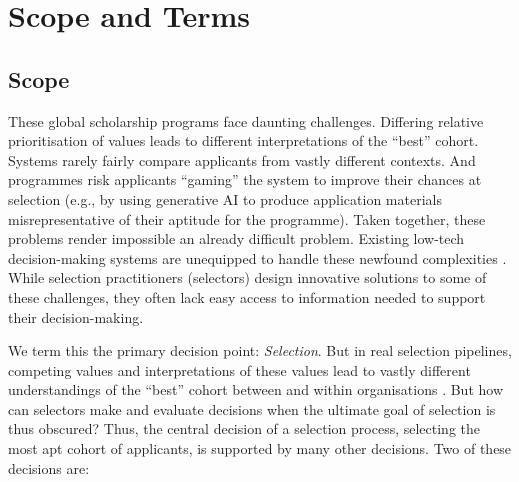 \section{Scope and Terms}
\subsection{Scope}


These global scholarship programs face daunting challenges. Differing relative prioritisation of values leads to different interpretations of the ``best'' cohort. Systems rarely fairly compare applicants from vastly different contexts. And programmes risk applicants ``gaming'' the system to improve their chances at selection (e.g., by using generative AI to produce application materials misrepresentative of their aptitude for the programme). Taken together, these problems render impossible an already difficult problem. Existing low-tech decision-making systems are unequipped to handle these newfound complexities \cite{Latzer_Hollnbuchner_Just_Saurwein_2014}. While selection practitioners (selectors) design innovative solutions to some of these challenges, they often lack easy access to information needed to support their decision-making.


We term this the primary decision point: \emph{Selection}. But in real selection pipelines, competing values and interpretations of these values lead to vastly different understandings of the ``best'' cohort between and within organisations \cite{zimmerman_research_2014}. But how can selectors make and evaluate decisions when the ultimate goal of selection is thus obscured? Thus, the central decision of a selection process, selecting the most apt cohort of applicants, is supported by many other decisions. Two of these decisions are: 

